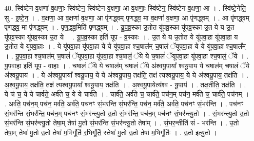 \documentclass[17pt]{extarticle}
\begin{document}
40. स्वि॑ष्टेन व॒क्षणा॑ व॒क्षणाः॒ स्वि॑ष्टेन॒ स्वि॑ष्टेन व॒क्षणा॒ आ व॒क्षणाः॒ स्वि॑ष्टेन॒ स्वि॑ष्टेन व॒क्षणा॒ आ । . स्वि॑ष्टे॒नेति॒ सु - इ॒ष्टे॒न॒ । . व॒क्षणा॒ आ व॒क्षणा॑ व॒क्षणा॒ आ पृ॑णद्ध्वम् पृणद्ध्व॒ मा व॒क्षणा॑ व॒क्षणा॒ आ पृ॑णद्ध्वम् । . आ पृ॑णद्ध्वम् पृणद्ध्व॒ मा पृ॑णद्ध्वम् । . पृ॒ण॒द्ध्व॒मिति॑ पृणद्ध्वम् । . यू॒प॒व्र॒स्का उ॒तोत यू॑पव्र॒स्का यू॑पव्र॒स्का उ॒त ये य उ॒त यू॑पव्र॒स्का यू॑पव्र॒स्का उ॒त ये । . यू॒प॒व्र॒स्का इति॑ यूप - व्र॒स्काः । . उ॒त ये य उ॒तोत ये यू॑पवा॒हा यू॑पवा॒हा य उ॒तोत ये यू॑पवा॒हाः । . ये यू॑पवा॒हा यू॑पवा॒हा ये ये यू॑पवा॒हा श्च॒षाल॑म् च॒षालं॑ ॅयूपवा॒हा ये ये यू॑पवा॒हा श्च॒षाल᳚म् । . यू॒प॒वा॒हा श्च॒षाल॑म् च॒षालं॑ ॅयूपवा॒हा यू॑पवा॒हा श्च॒षालं॒ ॅये ये च॒षालं॑ ॅयूपवा॒हा यू॑पवा॒हा श्च॒षालं॒ ॅये । . यू॒प॒वा॒हा इति॑ यूप - वा॒हाः । . च॒षालं॒ ॅये ये च॒षाल॑म् च॒षालं॒ ॅये अ॑श्वयू॒पाया᳚ श्वयू॒पाय॒ ये च॒षाल॑म् च॒षालं॒ ॅये अ॑श्वयू॒पाय॑ । . ये अ॑श्वयू॒पाया᳚ श्वयू॒पाय॒ ये ये अ॑श्वयू॒पाय॒ तक्ष॑ति॒ तक्ष॑ त्यश्वयू॒पाय॒ ये ये अ॑श्वयू॒पाय॒ तक्ष॑ति । . अ॒श्व॒यू॒पाय॒ तक्ष॑ति॒ तक्ष॑ त्यश्वयू॒पाया᳚ श्वयू॒पाय॒ तक्ष॑ति । . अ॒श्व॒यू॒पायेत्य॑श्व - यू॒पाय॑ । . तक्ष॒तीति॒ तक्ष॑ति । . ये च॑ च॒ ये ये चार्व॑ते॒ अर्व॑ते च॒ ये ये चार्व॑ते । . चार्व॑ते॒ अर्व॑ते च॒ चार्व॑ते॒ पच॑न॒म् पच॑न॒ मर्व॑ते च॒ चार्व॑ते॒ पच॑नम् । . अर्व॑ते॒ पच॑न॒म् पच॑न॒ मर्व॑ते॒ अर्व॑ते॒ पच॑नꣳ सं॒भर॑न्ति सं॒भर॑न्ति॒ पच॑न॒ मर्व॑ते॒ 
अर्व॑ते॒ पच॑नꣳ सं॒भर॑न्ति । . पच॑नꣳ सं॒भर॑न्ति सं॒भर॑न्ति॒ पच॑न॒म् पच॑नꣳ सं॒भर॑न्त्यु॒तो उ॒तो सं॒भर॑न्ति॒ पच॑न॒म् पच॑नꣳ सं॒भर॑न्त्यु॒तो । . सं॒भर॑न्त्यु॒तो उ॒तो सं॒भर॑न्ति सं॒भर॑न्त्यु॒तो तेषा॒म् तेषा॑ मु॒तो सं॒भर॑न्ति सं॒भर॑न्त्यु॒तो तेषा᳚म् । . सं॒भर॒न्तीति॑ सं - भर॑न्ति । . उ॒तो तेषा॒म् तेषा॑ मु॒तो उ॒तो तेषा॑ म॒भिगू᳚र्ति र॒भिगू᳚र्ति॒ स्तेषा॑ मु॒तो उ॒तो तेषा॑ म॒भिगू᳚र्तिः । . उ॒तो इत्यु॒तो । \newline
\pagebreak
{}
\end{document}

